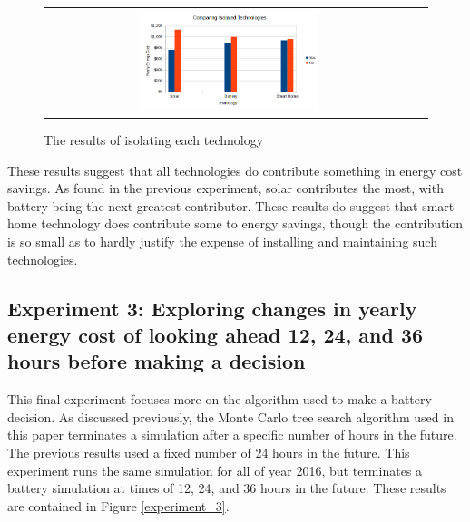 \begin{figure}
 \begin{center}
  \begin{tabular}{cc}
   \includegraphics[width=0.50\textwidth]{./figures/experiment_2.png} \\
   \end{tabular}
   \end{center}
\caption{The results of isolating each technology}
  \vspace{+1mm}
\label{experiment_2}
\end{figure}

These results suggest that all technologies do contribute something in energy cost savings. As found in the previous experiment, solar contributes the most, with battery being the next greatest contributor. These results do suggest that smart home technology does contribute some to energy savings, though the contribution is so small as to hardly justify the expense of installing and maintaining such technologies.

\subsection*{Experiment 3: Exploring changes in yearly energy cost of looking ahead 12, 24, and 36 hours before making a decision}

This final experiment focuses more on the algorithm used to make a battery decision. As discussed previously, the Monte Carlo tree search algorithm used in this paper terminates a simulation after a specific number of hours in the future. The previous results used a fixed number of 24 hours in the future. This experiment runs the same simulation for all of year 2016, but terminates a battery simulation at times of 12, 24, and 36 hours in the future. These results are contained in Figure \ref{experiment_3}.

